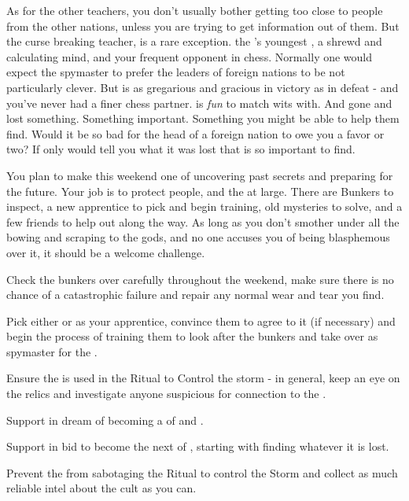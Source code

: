 \documentclass[char]{GL2020}
\begin{document}
As for the other teachers, you don’t usually bother getting too close to people from the other nations, unless you are trying to get information out of them. But the curse breaking teacher, \cPrince{} is a rare exception. \cPrince{\They} \cPrince{\are} the \cQueen{\Majesty}’s youngest , a shrewd and calculating mind, and your frequent opponent in chess. Normally one would expect the spymaster to prefer the leaders of foreign nations to be not particularly clever. But \cPrince{} is as gregarious and gracious in victory as in defeat - and you’ve never had a finer chess partner. \cPrince{} is \emph{fun} to match wits with. And \cPrince{\they} \cPrince{\have} gone and lost something. Something important. Something you might be able to help them find. Would it be so bad for the head of a foreign nation to owe you a favor or two? If only \cPrince{\they} would tell you what it was \cPrince{\they} lost that is so important to find.

You plan to make this weekend one of uncovering past secrets and preparing for the future. Your job is to protect people, and the \pShip{} at large. There are Bunkers to inspect, a new apprentice to pick and begin training, old mysteries to solve, and a few friends to help out along the way. As long as you don’t smother under all the bowing and scraping to the gods, and no one accuses you of being blasphemous over it, it should be a welcome challenge.

\begin{itemz}[Goals]
	\item Check the bunkers over carefully throughout the weekend, make sure there is no chance of a catastrophic failure and repair any normal wear and tear you find.
	\item Pick either \cTechStar{} or \cInitiate{} as your apprentice, convince them to agree to it (if necessary) and begin the process of training them to look after the bunkers and take over as spymaster for the \pShippies{}.
	\item Ensure the \iNet{} is used in the Ritual to Control the storm - in general, keep an eye on the relics and investigate anyone suspicious for connection to the \pGoaties{}.
	\item Support \cPirate{} in \cPirate{\their} dream of becoming a \cPirate{\cleric} of \cEbb{} and \cFlow{}.
	\item Support \cPrince{} in \cPrince{\their} bid to become the next \cPrince{\Majesty} of \pFarm{}, starting with finding whatever it is \cPrince{\they} lost.
	\item Prevent the \pGoaties{} from sabotaging the Ritual to control the Storm and collect as much reliable intel about the cult as you can.
\end{itemz}
\end{document}
